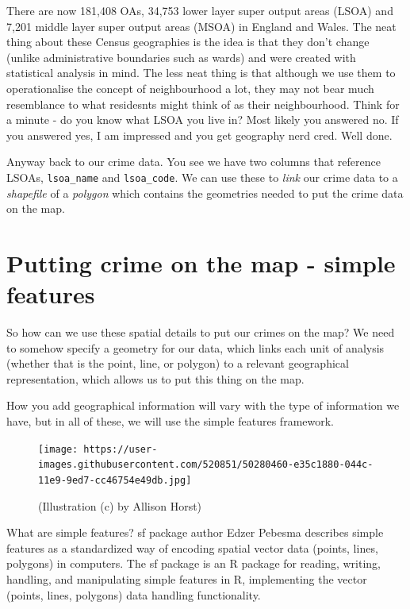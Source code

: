\documentclass[
]{book}
\begin{document}
There are now 181,408 OAs, 34,753 lower layer super output areas (LSOA) and 7,201 middle layer super output areas (MSOA) in England and Wales. The neat thing about these Census geographies is the idea is that they don't change (unlike administrative boundaries such as wards) and were created with statistical analysis in mind. The less neat thing is that although we use them to operationalise the concept of neighbourhood a lot, they may not bear much resemblance to what residesnts might think of as their neighbourhood. Think for a minute - do you know what LSOA you live in? Most likely you answered no. If you answered yes, I am impressed and you get geography nerd cred. Well done.

Anyway back to our crime data. You see we have two columns that reference LSOAs, \texttt{lsoa\_name} and \texttt{lsoa\_code}. We can use these to \emph{link} our crime data to a \emph{shapefile} of a \emph{polygon} which contains the geometries needed to put the crime data on the map.

\hypertarget{putting-crime-on-the-map---simple-features}{%
\section{Putting crime on the map - simple features}\label{putting-crime-on-the-map---simple-features}}

So how can we use these spatial details to put our crimes on the map? We need to somehow specify a geometry for our data, which links each unit of analysis (whether that is the point, line, or polygon) to a relevant geographical representation, which allows us to put this thing on the map.

How you add geographical information will vary with the type of information we have, but in all of these, we will use the simple features framework.

\begin{figure}
\centering
\texttt{[image: https://user-images.githubusercontent.com/520851/50280460-e35c1880-044c-11e9-9ed7-cc46754e49db.jpg]}
\caption{(Illustration (c) by Allison Horst)}
\end{figure}

What are simple features? sf package author Edzer Pebesma describes simple features as a standardized way of encoding spatial vector data (points, lines, polygons) in computers. The sf package is an R package for reading, writing, handling, and manipulating simple features in R, implementing the vector (points, lines, polygons) data handling functionality.
\end{document}
